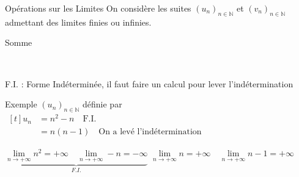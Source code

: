 \documentclass{cours}
\begin{document}
    \begin{Gpartie}{Opérations sur les Limites} 
        On considère les suites $(u_n)_{n\in\mathbb{N}}$ et $(v_n)_{n\in\mathbb{N}}$ admettant des limites finies ou infinies.
        \begin{Spartie}{Somme}
            \begin{center}
            \vspace*{-1ex}
            \end{center}
            \parbox{\linewidth}{} \\[2ex]
            \begin{center}F.I. : Forme Indéterminée, il faut faire un calcul pour lever l'indétermination\end{center}
            \begin{SSpartie}{Exemple} 
                $(u_n)_{n\in\mathbb{N}}$ définie par $\begin{aligned}[t]u_n&=n^2-n\quad\text{F.I.} \\ &=n(n-1)\quad\text{On a levé l'indétermination}\end{aligned}$

                $\underbrace{\lim\limits_{n\to +\infty}n^2=+\infty\quad\lim\limits_{n\to +\infty}-n=-\infty}_{F.I.}$
                \qquad$\lim\limits_{n\to +\infty}n=+\infty\quad\lim\limits_{n\to +\infty}n-1=+\infty$


\end{SSpartie}
\end{Spartie}
\end{Gpartie}
\end{document}

